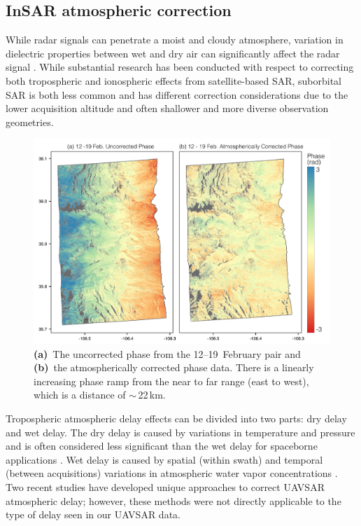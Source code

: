 \hypertarget{ch3-methods-10}{\subsection{InSAR atmospheric correction}\label{ch3-methods-10}}



While radar signals can penetrate a moist and cloudy atmosphere, variation in dielectric properties between wet and dry air can significantly affect the radar signal \citep{ferrettiPermanentScatterersSAR2001}. While substantial research has been conducted with respect to correcting both tropospheric \citep{yuInterferometricSyntheticAperture2018} and ionospheric \citep{meyerPerformanceRequirementsIonospheric2011} effects from satellite-based SAR, suborbital SAR is both less common and has different correction considerations due to the lower acquisition altitude and often shallower and more diverse observation geometries.

\begin{figure}[t]
\centering
\includegraphics[width=14cm]{figures/ch3_figs/fig06.pdf}
\caption{\textbf{(a)}~The uncorrected phase from the 12--19~February pair and \textbf{(b)}~the atmospherically corrected phase data. There is a linearly increasing phase ramp from the near to far range (east to west), which is a distance of $\sim$\,22\,km.}
\end{figure}

Tropospheric atmospheric delay effects can be divided into two parts: dry delay and wet delay. The dry delay is caused by variations in temperature and pressure and is often considered less significant than the wet delay for spaceborne applications \citep{zebkerAtmosphericEffectsInterferometric1997}. Wet delay is caused by spatial (within swath) and temporal (between acquisitions) variations in atmospheric water vapor concentrations \citep{danklmayerAssessmentAtmosphericPropagation2009}. Two recent studies \citep{michaelidesPermafrostDynamicsObservatory2021,bekaertExploitingUAVSARComprehensive2018} have developed unique approaches to correct UAVSAR atmospheric delay; however, these methods were not directly applicable to the type of delay seen in our UAVSAR data.


